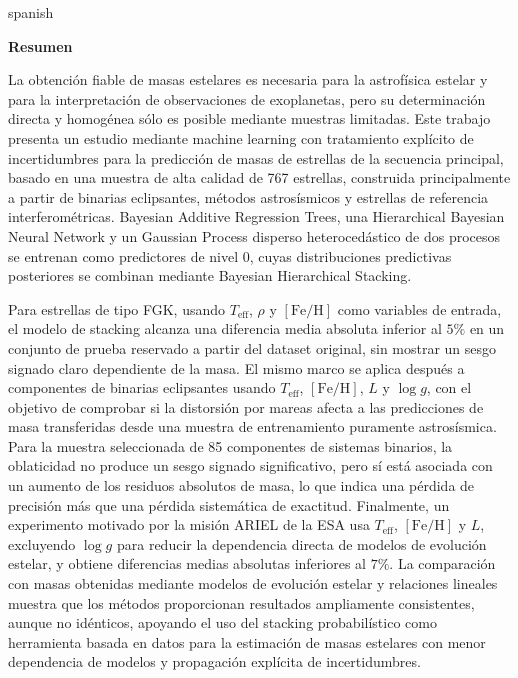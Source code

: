 {    \vspace{0.8em}
    \begin{otherlanguage*}{spanish}
    \itshape
    \begin{center}
        \large\bfseries Resumen
    \end{center}
    La obtenci\'on fiable de masas estelares es necesaria para la astrof\'isica estelar y para la interpretaci\'on de observaciones de exoplanetas, pero su determinaci\'on directa y homog\'enea s\'olo es posible mediante muestras limitadas. Este trabajo presenta un estudio mediante machine learning con tratamiento expl\'icito de incertidumbres para la predicci\'on de masas de estrellas de la secuencia principal, basado en una muestra de alta calidad de 767 estrellas, construida principalmente a partir de binarias eclipsantes, m\'etodos astros\'ismicos y estrellas de referencia interferom\'etricas. Bayesian Additive Regression Trees, una Hierarchical Bayesian Neural Network y un Gaussian Process disperso heteroced\'astico de dos procesos se entrenan como predictores de nivel 0, cuyas distribuciones predictivas posteriores se combinan mediante Bayesian Hierarchical Stacking.

    \par\smallskip
    Para estrellas de tipo FGK, usando $T_{\mathrm{eff}}$, $\rho$ y $[\mathrm{Fe}/\mathrm{H}]$ como variables de entrada, el modelo de stacking alcanza una diferencia media absoluta inferior al $5\%$ en un conjunto de prueba reservado a partir del dataset original, sin mostrar un sesgo signado claro dependiente de la masa. El mismo marco se aplica despu\'es a componentes de binarias eclipsantes usando $T_{\mathrm{eff}}$, $[\mathrm{Fe}/\mathrm{H}]$, $L$ y $\log g$, con el objetivo de comprobar si la distorsi\'on por mareas afecta a las predicciones de masa transferidas desde una muestra de entrenamiento puramente astros\'ismica. Para la muestra seleccionada de 85 componentes de sistemas binarios, la oblaticidad no produce un sesgo signado significativo, pero s\'i est\'a asociada con un aumento de los residuos absolutos de masa, lo que indica una p\'erdida de precisi\'on m\'as que una p\'erdida sistem\'atica de exactitud. Finalmente, un experimento motivado por la misi\'on ARIEL de la ESA usa $T_{\mathrm{eff}}$, $[\mathrm{Fe}/\mathrm{H}]$ y $L$, excluyendo $\log g$ para reducir la dependencia directa de modelos de evoluci\'on estelar, y obtiene diferencias medias absolutas inferiores al $7\%$. La comparaci\'on con masas obtenidas mediante modelos de evoluci\'on estelar y relaciones lineales muestra que los m\'etodos proporcionan resultados ampliamente consistentes, aunque no id\'enticos, apoyando el uso del stacking probabil\'istico como herramienta basada en datos para la estimaci\'on de masas estelares con menor dependencia de modelos y propagaci\'on expl\'icita de incertidumbres.
    \end{otherlanguage*}
}
\endgroup
\newpage

